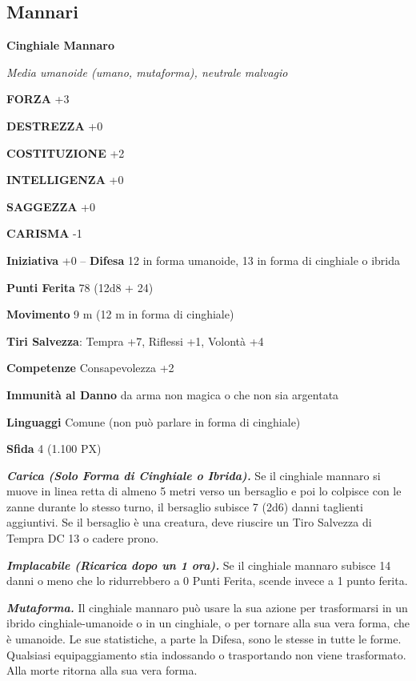 \begin{multicols}{2}
	\subsection{Mannari}

	\medskip{}\textbf{Cinghiale Mannaro}

	\textit{Media umanoide (umano, mutaforma), neutrale malvagio}

	\textbf{FORZA} +3

	\textbf{DESTREZZA} +0

	\textbf{COSTITUZIONE} +2

	\textbf{INTELLIGENZA} +0

	\textbf{SAGGEZZA} +0

	\textbf{CARISMA} -1

	\textbf{Iniziativa} +0 -- \textbf{Difesa} 12 in forma umanoide, 13 in forma di cinghiale o ibrida

	\textbf{Punti Ferita} 78 (12d8 + 24)

	\textbf{Movimento} 9 m (12 m in forma di cinghiale)

	\textbf{Tiri Salvezza}: Tempra +7, Riflessi +1, Volontà +4

	\textbf{Competenze} Consapevolezza +2

	\textbf{Immunità al Danno} da arma non magica o che non sia argentata

	\textbf{Linguaggi} Comune (non può parlare in forma di cinghiale)

	\textbf{Sfida} 4 (1.100 PX)

	\textit{\textbf{Carica (Solo Forma di Cinghiale o Ibrida).}} Se il cinghiale mannaro si muove in linea retta di almeno 5 metri verso un bersaglio e poi lo colpisce con le zanne durante lo stesso turno, il bersaglio subisce 7 (2d6) danni taglienti aggiuntivi. Se il bersaglio è una creatura, deve riuscire un Tiro Salvezza di Tempra DC 13 o cadere prono.

	\textit{\textbf{Implacabile (Ricarica dopo un 1 ora).}} Se il cinghiale mannaro subisce 14 danni o meno che lo ridurrebbero a 0 Punti Ferita, scende invece a 1 punto ferita.

	\textit{\textbf{Mutaforma.}} Il cinghiale mannaro può usare la sua azione per trasformarsi in un ibrido cinghiale-umanoide o in un cinghiale, o per tornare alla sua vera forma, che è umanoide. Le sue statistiche, a parte la Difesa, sono le stesse in tutte le forme. Qualsiasi equipaggiamento stia indossando o trasportando non viene trasformato. Alla morte ritorna alla sua vera forma.


\end{multicols}
